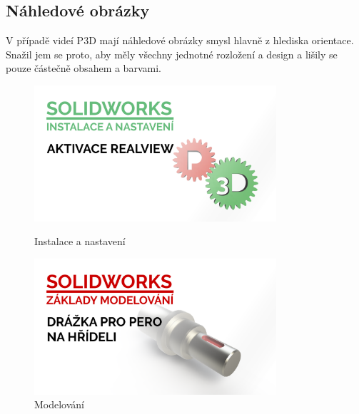 \subsection{Náhledové obrázky}
V případě videí P3D mají náhledové obrázky smysl hlavně z hlediska orientace.
Snažil jem se proto, aby měly všechny jednotné rozložení a design a lišily se pouze částečně obsahem a barvami.
\begin{figure}[htbp]
    \centering
    \begin{minipage}[b]{0.45\textwidth}
        \centering
        \includegraphics[width=0.8\textwidth]{img/020/aktivace-realview-thumbnail.png}
        \caption{Instalace a nastavení}
        \label{fig:thumb1}
    \end{minipage}
    \qquad
    \begin{minipage}[b]{0.45\textwidth}
        \centering
        \includegraphics[width=0.8\textwidth]{img/020/perodr-hr-thumbnail.png}
        \caption{Modelování}
        \label{fig:thumb2}
    \end{minipage}
\end{figure}

